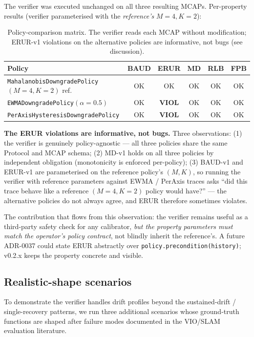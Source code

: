 \documentclass[acmsmall,nonacm=true,review=false]{acmart}
\theoremstyle{plain}
\begin{document}
The verifier was executed unchanged on all three resulting MCAPs.
Per-property results (verifier parameterised with the
\emph{reference's} $M{=}4, K{=}2$):

\begin{table}[h]
\centering
\small
\begin{tabular}{lccccc}
\toprule
\textbf{Policy} & \textbf{BAUD} & \textbf{ERUR} & \textbf{MD} & \textbf{RLB} & \textbf{FPB} \\
\midrule
\texttt{MahalanobisDowngradePolicy}$(M{=}4, K{=}2)$ ref. & OK & OK & OK & OK & OK \\
\texttt{EWMADowngradePolicy}$(\alpha{=}0.5)$            & OK & \textbf{VIOL} & OK & OK & OK \\
\texttt{PerAxisHysteresisDowngradePolicy}              & OK & \textbf{VIOL} & OK & OK & OK \\
\bottomrule
\end{tabular}
\caption{Policy-comparison matrix. The verifier reads each MCAP
without modification; ERUR-v1 violations on the alternative
policies are informative, not bugs (see discussion).}
\label{tab:policy-comparison}
\end{table}

\textbf{The ERUR violations are informative, not bugs.} Three
observations: (1) the verifier is genuinely policy-agnostic ---
all three policies share the same Protocol and MCAP schema;
(2) MD-v1 holds on all three policies by independent obligation
(monotonicity is enforced per-policy); (3) BAUD-v1 and ERUR-v1
are parameterised on the reference policy's $(M, K)$, so running
the verifier with reference parameters against EWMA / PerAxis
traces asks ``did this trace behave like a reference $(M{=}4,
K{=}2)$ policy would have?'' --- the alternative policies do not
always agree, and ERUR therefore sometimes violates.

The contribution that flows from this observation: the verifier
remains useful as a third-party safety check for any calibrator,
\emph{but the property parameters must match the operator's policy
contract}, not blindly inherit the reference's. A future ADR-0037
could state ERUR abstractly over \texttt{policy.precondition(history)};
v0.2.x keeps the property concrete and visible.

\subsection{Realistic-shape scenarios}
\label{sec:realistic}

To demonstrate the verifier handles drift profiles beyond the
sustained-drift / single-recovery patterns, we run three additional
scenarios whose ground-truth functions are shaped after failure
modes documented in the VIO/SLAM evaluation literature.
\end{document}

